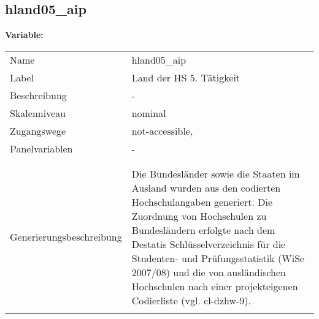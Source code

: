 	
	
	\subsection{hland05\_aip}
	\label{subSection:hland05_aip}

	\noindent\textbf{Variable:}\\
		\begin{tabular}{lL{11.3cm}}
			\label{tableVariable:hland05_aip}
			Name & hland05\_aip \\
			Label & Land der HS 5. Tätigkeit \\
			Beschreibung & - \\
			Skalenniveau & nominal \\
			Zugangswege &
				not-accessible,
 \\
			Panelvariablen & -
			 \\
			 \\
 \\
					Generierungsbeschreibung & Die Bundesländer sowie die Staaten im Ausland wurden aus den codierten Hochschulangaben generiert. Die Zuordnung von Hochschulen zu Bundesländern erfolgte nach dem Destatis Schlüsselverzeichnis für die Studenten- und Prüfungsstatistik (WiSe 2007/08) und die von ausländischen Hochschulen nach einer projekteigenen Codierliste (vgl. cl-dzhw-9).
				 \\	
			 \\
		\end{tabular}






	
	\newpage
